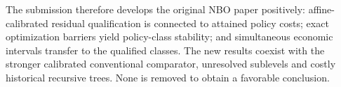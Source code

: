 The submission therefore develops the original NBO paper positively:
affine-calibrated residual qualification is connected to attained policy
costs; exact optimization barriers yield policy-class stability; and
simultaneous economic intervals transfer to the qualified classes. The
new results coexist with the stronger calibrated conventional
comparator, unresolved sublevels and costly historical recursive trees.
None is removed to obtain a favorable conclusion.

